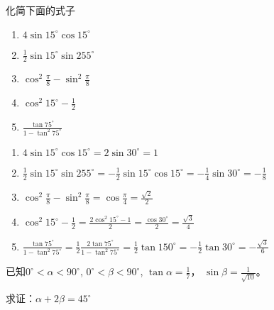 \begin{example}
    化简下面的式子
\begin{multicols}{2}
\begin{enumerate}
    \item $4\sin 15^{\circ}\cos 15^{\circ}$
    \item $\frac{1}{2}\sin 15^{\circ}\sin 255^{\circ}$
    \item $\cos^2\frac{\pi}{8}-\sin^2\frac{\pi}{8}$
    \item $\cos^2 15^{\circ}-\frac{1}{2}$
    \item $\frac{\tan 75^{\circ}}{1-\tan^2 75^{\circ}}$
\end{enumerate}
   \end{multicols} 
\end{example}

\begin{solution}
\begin{enumerate}
    \item $4\sin 15^{\circ}\cos 15^{\circ}=2\sin 30^{\circ}=1$
    \item $\frac{1}{2}\sin 15^{\circ}\sin 255^{\circ}=-\frac{1}{2}\sin 15^{\circ}\cos 15^{\circ}=-\frac{1}{4}\sin 30^{\circ}=-\frac{1}{8}$
    \item $\cos^2\frac{\pi}{8}-\sin^2\frac{\pi}{8}=\cos\frac{\pi}{4}=\frac{\sqrt{2}}{2}$
    \item $\cos^2 15^{\circ}-\frac{1}{2}=\frac{2\cos^2 15^{\circ}-1}{2}=\frac{\cos 30^{\circ}}{2}=\frac{\sqrt{3}}{4}$
    \item $\frac{\tan 75^{\circ}}{1-\tan^2 75^{\circ}}=\frac{1}{2}\frac{2\tan 75^{\circ}}{1-\tan^2 75^{\circ}}=\frac{1}{2}\tan 150^{\circ}=-\frac{1}{2}\tan 30^{\circ}=-\frac{\sqrt{3}}{6}$
\end{enumerate}    
\end{solution}

\begin{example}
    已知$0^{\circ}<\alpha<90^{\circ}$, $0^{\circ}<\beta<90^{\circ}$, $\tan\alpha=\frac{1}{7}$，
    $\sin\beta=\frac{1}{\sqrt{10}}$。
    
    求证：$\alpha+2\beta=45^{\circ}$
\end{example}

\begin{figure}[htp]
    \centering
    \caption{}
\end{figure}



